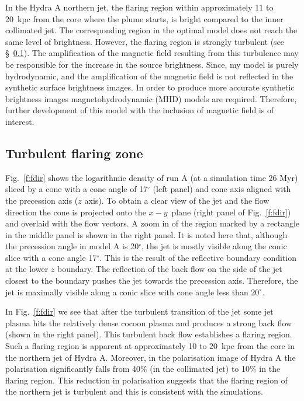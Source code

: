 
In the Hydra A northern jet, the flaring region within approximately 11 to 20~kpc from the core where the plume starts, is bright compared to the inner collimated jet. The corresponding region in the optimal model does not reach the same level of brightness. However, the flaring region is strongly turbulent (see \S~\ref{flaring}).
The amplification of the magnetic field resulting from this turbulence may be responsible for the increase in the source brightness. Since, my model is purely hydrodynamic, and the amplification of the magnetic field is not reflected in the synthetic surface brightness images. In order to produce more accurate synthetic brightness images magnetohydrodynamic (MHD) models are required. Therefore, further development of this model with the inclusion of magnetic field is of interest.

\subsection{Turbulent flaring zone}
\label{flaring}
Fig.~\ref{f:fdir} shows the logarithmic density of run A (at a simulation time 26 Myr) sliced by a cone with a cone angle of 17$^{\circ}$ (left panel) and cone axis aligned with the precession axis ($z$ axis). To obtain a clear view of the jet and the flow direction the cone is projected onto the $x-y$~plane (right panel of Fig.~\ref{f:fdir}) and overlaid with the flow vectors. A zoom in of the region marked by a rectangle in the middle panel is shown in the right panel. It is noted here that, although the precession angle in model A is 20$^{\circ}$, the jet is mostly visible along the conic slice with a cone angle 17$^{\circ}$. This is the result of the reflective boundary condition at the lower $z$ boundary. The reflection of the back flow on the side of the jet closest to the boundary pushes the jet towards the precession axis. Therefore, the jet is maximally visible along a conic slice with cone angle less than $20^{\circ}$. 

In Fig.~\ref{f:fdir} we see that after the turbulent transition of the jet some jet plasma hits the relatively dense cocoon plasma and produces a strong back flow (shown in the right panel). This turbulent back flow  establishes a flaring region. Such a flaring region is apparent at approximately 10 to 20~kpc from the core in the northern jet of Hydra A.
 Moreover, in the polarisation image of Hydra A \citep{taylor90} the polarisation significantly falls from 40$\%$ (in the collimated jet) to 10$\%$ in the flaring region. This reduction in polarisation suggests that the flaring region of the northern jet is turbulent and this is consistent with the simulations.  

